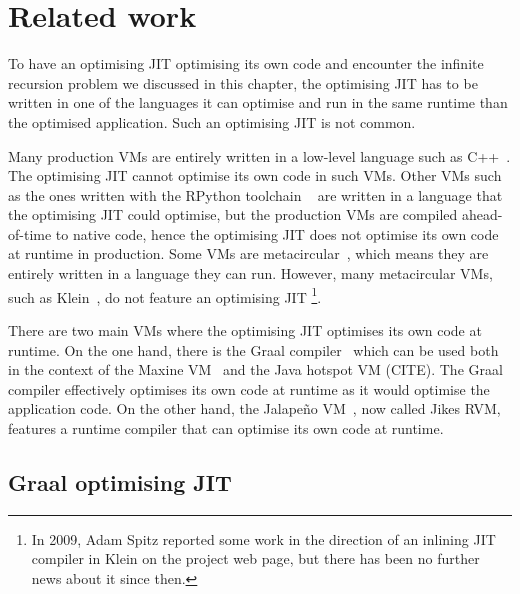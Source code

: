 \documentclass[a4paper,12pt,twoside]{../includes/ThesisStyle}
\begin{document}

\section{Related work}
\label{sec:recRelW}

To have an optimising JIT optimising its own code and encounter the infinite recursion problem we discussed in this chapter, the optimising JIT has to be written in one of the languages it can optimise and run in the same runtime than the optimised application. Such an optimising JIT is not common.

Many production VMs are entirely written in a low-level language such as C++~\cite{V8,Webkit15}. The optimising JIT cannot optimise its own code in such VMs. Other VMs such as the ones written with the RPython toolchain ~\cite{Rigo06a} are written in a language that the optimising JIT could optimise, but the production VMs are compiled ahead-of-time to native code, hence the optimising JIT does not optimise its own code at runtime in production. Some VMs are metacircular~\cite{Unga05b,Alp99a}, which means they are entirely written in a language they can run. However, many metacircular VMs, such as Klein~\cite{Unga05b}, do not feature an optimising JIT \footnote{In 2009, Adam Spitz reported some work in the direction of an inlining JIT compiler in Klein on the project web page, but there has been no further news about it since then.}. 

There are two main VMs where the optimising JIT optimises its own code at runtime. On the one hand, there is the Graal compiler~\cite{Oracle13,Dubo13c} which can be used both in the context of the Maxine VM~\cite{Wimm13a} and the Java hotspot VM (CITE). The Graal compiler effectively optimises its own code at runtime as it would optimise the application code. On the other hand, the Jalape\~no VM~\cite{Alp99a}, now called Jikes RVM, features a runtime compiler that can optimise its own code at runtime. 

\subsection{Graal optimising JIT}
\end{document}
